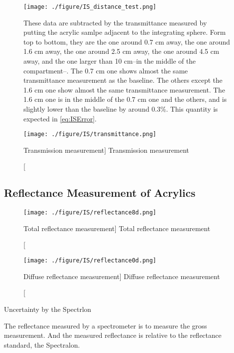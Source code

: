 \begin{figure}
    \centering
    \texttt{[image: ./figure/IS\_distance\_test.png]}
    \caption[Example of transmittance measured in different distance from the integrating sphere.]
{
These data are subtracted by the transmittance measured by putting the acrylic samlpe adjacent to the integrating sphere.
Form top to bottom, they are the one around 0.7 cm away, the one around 1.6 cm away, the one around 2.5 cm away, the one around 4.5 cm away,
and the one larger than 10 cm--in the middle of the compartment--. The 0.7 cm one shows almost the same transmittance measurement as the baseline.
The others except the 1.6 cm one show almost the same transmittance measurement. The 1.6 cm one is in the middle of the 0.7 cm one and the others,
and is slightly lower than the baseline by around 0.3\%. This quantity is expected in \ref{eq:ISError}.
}
    \label{fig:IS_distance_test.png}
    \end{figure}



\begin{figure}
    \centering
    \texttt{[image: ./figure/IS/transmittance.png]}
    \caption
    [Transmission measurement]
    {Transmission measurement}
    \label{fig:transmission.png}
    \end{figure}




\subsection{Reflectance Measurement of Acrylics}


\begin{figure}
    \centering
    \texttt{[image: ./figure/IS/reflectance8d.png]}
    \caption
    [Total reflectance measurement]
    {Total reflectance measurement}
    \label{fig:reflectance8d.png}
    \end{figure}


\begin{figure}
    \centering
    \texttt{[image: ./figure/IS/reflectance0d.png]}
    \caption
    [Diffuse reflectance measurement]
    {Diffuse reflectance measurement}
    \label{fig:reflectance0d.png}
    \end{figure}



Uncertainty by the Spectrlon

The reflectance measured by a spectrometer is to measure the gross measurement. And the measured
reflectance is relative to the reflectance standard, the Spectralon.

